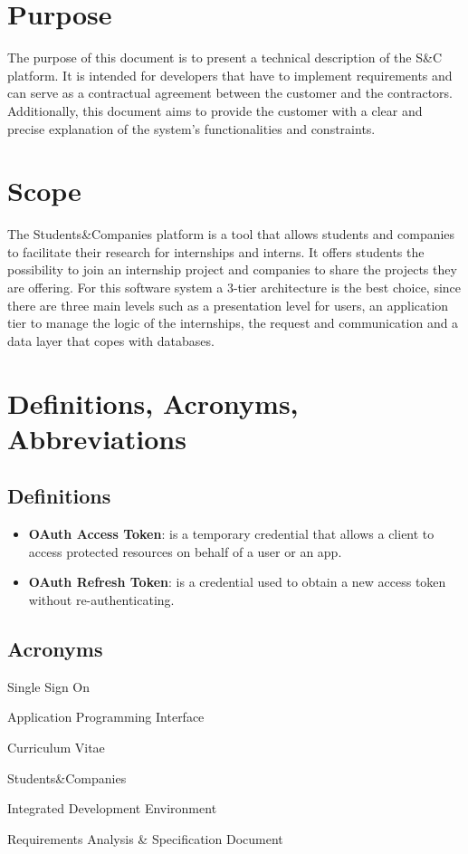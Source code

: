\section{Purpose}
The purpose of this document is to present a technical description of the S\&C platform. It is intended for developers that have to implement requirements and can serve as a contractual agreement between the customer and the contractors. Additionally, this document aims to provide the customer with a clear and precise explanation of the system's functionalities and constraints.
\section{Scope}
The Students\&Companies platform is a tool that allows students and companies to facilitate their research for internships and interns. It offers students the possibility to join an internship project and companies to share the projects they are offering. 
For this software system a 3-tier architecture is the best choice, since there are three main levels such as a presentation level for users, an application tier to manage the logic of the internships, the request and communication and a data layer that copes with databases.

\section{Definitions, Acronyms, Abbreviations}

\subsection{Definitions}
\begin{itemize}
    \item \textbf{OAuth Access Token}: is a temporary credential that allows a client to access protected resources on behalf of a user or an app.
    \item \textbf{OAuth Refresh Token}: is a credential used to obtain a new access token without re-authenticating.
\end{itemize}


\subsection{Acronyms}
\begin{description}[leftmargin=0pt] 
    \item [SSO:] Single Sign On
    \item [API:] Application Programming Interface
    \item [CV:] Curriculum Vitae
    \item [S\&C:] Students\&Companies
    \item [IDE:] Integrated Development Environment
    \item[RASD:] Requirements Analysis \& Specification Document
\end{description}


